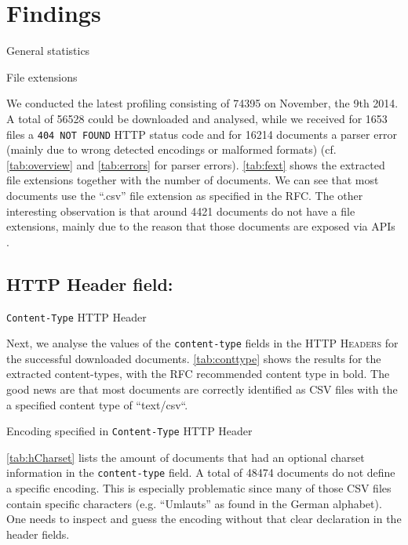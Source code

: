 \documentclass{scrartcl}
\begin{document}

\section{Findings}
\begin{table}[h]
\centering

\caption{General statistics\label{tab:overview}}
\end{table}

\begin{table}[h]
\centering

\caption{File extensions\label{tab:fext}}
\end{table}
We conducted the latest profiling consisting of 74395 on November, the 9th 2014.
A total of 56528 could be downloaded and analysed, while we received for 1653 files a \texttt{404 NOT FOUND} HTTP status code and for 16214 documents a parser error (mainly due to wrong detected encodings or malformed formats) (cf. \autoref{tab:overview} and \autoref{tab:errors} for parser errors). \autoref{tab:fext} shows the extracted file extensions together with the number of documents.
We can see that most documents use the ``.csv'' file extension as specified in the RFC. The other interesting observation is that around 4421 documents do not have a file extensions, mainly due to the reason that those documents are exposed via APIs  .


\subsection{HTTP Header field:}
\begin{table}[h]
\centering

\caption{\texttt{Content-Type} \textsc{HTTP} Header\label{tab:conttype}}
\end{table}
Next, we analyse the values of the \texttt{content-type} fields in the \textsc{HTTP Headers} for the successful downloaded documents.
\autoref{tab:conttype} shows the results for the extracted content-types, with the RFC recommended content type in bold. 
The good news are that most documents are correctly identified as CSV files with the a specified content type of ``text/csv``. 

\begin{table}[h]
\centering

\caption{Encoding specified in  \texttt{Content-Type} \textsc{HTTP} Header\label{tab:hCharset}}
\end{table}
\autoref{tab:hCharset} lists the amount of documents that had an optional charset information in the \texttt{content-type} field. 
A total of 48474 documents do not define a specific encoding. 
This is especially problematic since many of those CSV files contain specific characters (e.g. ``Umlauts'' as found in the German alphabet). 
One needs to inspect and guess the encoding without that clear declaration in the header fields. 
\end{document}
